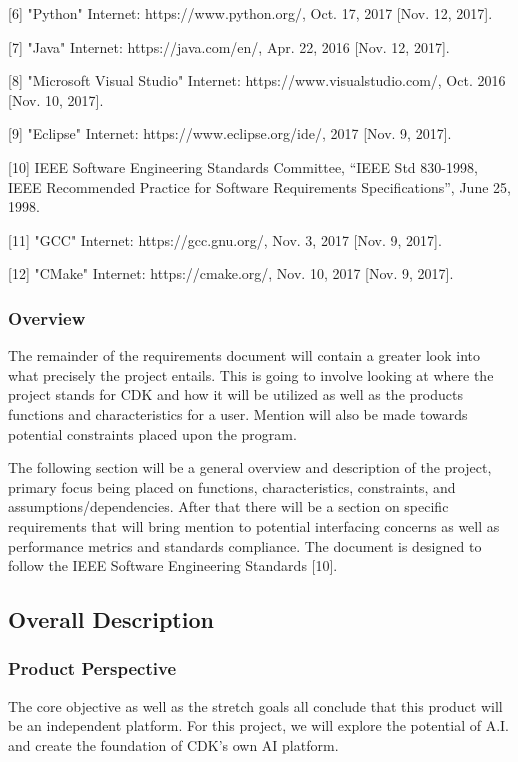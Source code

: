 \documentclass[article, onecolumn, draftclsnofoot,10pt, compsoc]{IEEEtran}
\begin{document}
[6] "Python" Internet: https://www.python.org/, Oct. 17, 2017 [Nov. 12, 2017].

[7] "Java" Internet: https://java.com/en/, Apr. 22, 2016 [Nov. 12, 2017].

[8] "Microsoft Visual Studio" Internet: https://www.visualstudio.com/, Oct. 2016 [Nov. 10, 2017].

[9] "Eclipse" Internet: https://www.eclipse.org/ide/, 2017 [Nov. 9, 2017].

[10] IEEE Software Engineering Standards Committee, “IEEE Std 830-1998, IEEE Recommended Practice for Software Requirements Specifications”, June 25, 1998.

[11] "GCC" Internet: https://gcc.gnu.org/, Nov. 3, 2017 [Nov. 9, 2017].

[12] "CMake" Internet: https://cmake.org/, Nov. 10, 2017 [Nov. 9, 2017].

\subsubsection{Overview}
The remainder of the requirements document will contain a greater look into what precisely the project entails. This is going to involve looking at where the project stands for CDK and how it will be utilized as well as the products functions and characteristics for a user. Mention will also be made towards potential constraints placed upon the program.

The following section will be a general overview and description of the project, primary focus being placed on functions, characteristics, constraints, and assumptions/dependencies. After that there will be a section on specific requirements that will bring mention to potential interfacing concerns as well as performance metrics and standards compliance. The document is designed to follow the IEEE Software Engineering Standards [10].


\subsection{Overall Description}
\subsubsection{Product Perspective}
The core objective as well as the stretch goals all conclude that this product will be an independent platform. For this project, we will explore the potential of A.I. and create the foundation of CDK’s own AI platform.
\end{document}
